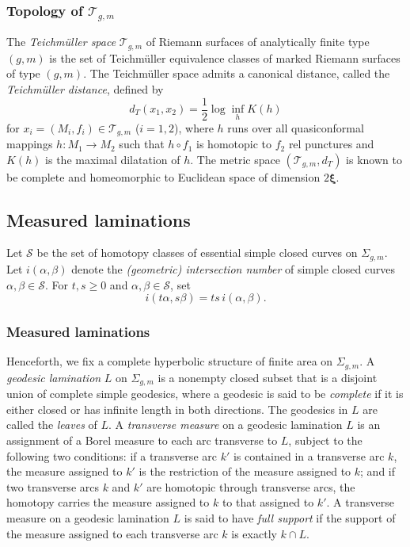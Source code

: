 \documentclass[dvipdfmx]{amsart}
\theoremstyle{remark}
\newcommand{\teich}{\mathcal{T}}
\newcommand{\convgenus}{{\boldsymbol \xi}}
\begin{document}
\subsubsection{Topology of $\teich_{g,m}$}
The \emph{Teichm\"uller space} $\teich_{g,m}$ of Riemann surfaces of analytically finite type $(g,m)$ is the set of Teichm\"uller equivalence classes of marked Riemann surfaces of type $(g,m)$.
The Teichm\"uller space admits a canonical distance, called the \emph{Teichm\"uller distance},
defined by
\[
d_T(x_1,x_2)=\frac{1}{2}\log \inf_h K(h)
\]
for $x_i=(M_i,f_i)\in \teich_{g,m}$ ($i=1,2$), where $h$ runs over all quasiconformal mappings $h\colon M_1\to M_2$ such that $h\circ f_1$ is homotopic to $f_2$ rel punctures and $K(h)$ is the maximal dilatation of $h$.
The metric space $(\teich_{g,m},d_T)$ is known to be complete and homeomorphic to Euclidean space of dimension $2\convgenus$.

\subsection{Measured laminations}
\label{subsec:measured_laminations}
Let $\mathcal{S}$ be the set of homotopy classes of 
essential simple closed curves on $\Sigma_{g,m}$.
Let $i(\alpha,\beta)$ denote the \emph{(geometric) intersection number} of simple closed curves $\alpha,\beta\in \mathcal{S}$.
For $t,s\ge0$ and $\alpha,\beta\in\mathcal S$, set
\begin{equation}
\label{eq:intersection-number-WS}
i(t\alpha,s\beta)=ts\,i(\alpha,\beta).
\end{equation}

\subsubsection{Measured laminations}
Henceforth, we fix a complete hyperbolic structure of finite area on $\Sigma_{g,m}$.
A \emph{geodesic lamination} $L$ on $\Sigma_{g,m}$ is a nonempty closed subset that is a disjoint union of complete simple geodesics, where a geodesic is said to be \emph{complete} if it is either closed or has infinite length in both directions.
The geodesics in $L$ are called the \emph{leaves} of $L$.
A \emph{transverse measure} on a geodesic lamination $L$ is an assignment of a Borel measure to each arc transverse to $L$, subject to the following two conditions: if a transverse arc $k'$ is contained in a transverse arc $k$, the measure assigned to $k'$ is the restriction of the measure assigned to $k$; and if two transverse arcs $k$ and $k'$ are homotopic through transverse arcs, the homotopy carries the measure assigned to $k$ to that assigned to $k'$.
A transverse measure on a geodesic lamination $L$ is said to have \emph{full support} if the support of the measure assigned to each transverse arc $k$ is exactly $k\cap L$.
\end{document}
